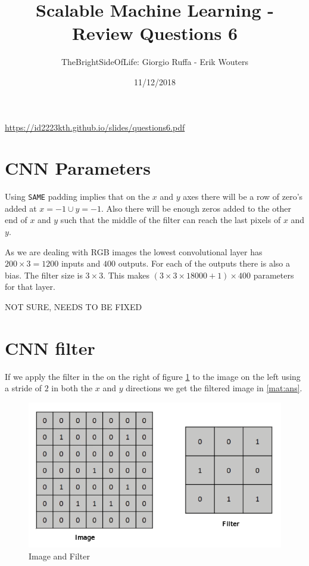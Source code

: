 \documentclass[a4paper]{article}
\title{Scalable Machine Learning - Review Questions 6}
\author{TheBrightSideOfLife: Giorgio Ruffa - Erik Wouters}
\date{11/12/2018}
\begin{document}
\maketitle

\url{https://id2223kth.github.io/slides/questions6.pdf}

\section{CNN Parameters}
Using \texttt{SAME} padding implies that on the $x$ and $y$ axes there will be a row of zero's added at $x=-1 \cup y=-1$. Also there will be enough zeros added to the other end of $x$ and $y$ such that the middle of the filter can reach the last pixels of $x$ and $y$.


As we are dealing with RGB images the lowest convolutional layer has $200 \times 3 = 1200$ inputs and $400$ outputs. For each of the outputs there is also a bias. The filter size is $3 \times 3$. This makes $(3 \times 3 \times 18000 + 1) \times 400$ parameters for that layer.

NOT SURE, NEEDS TO BE FIXED


\section{CNN filter}
If we apply the filter in the on the right of figure \ref{fig:q2} to the image on the left using a stride of $2$ in both the $x$ and $y$ directions we get the filtered image in \ref{mat:ans}.

\begin{figure}[ht]
  \centering
  \includegraphics[scale=0.4]{Reports/Images/q2.png}
  \caption{Image and Filter}
  \label{fig:q2}
\end{figure}
\end{document}
